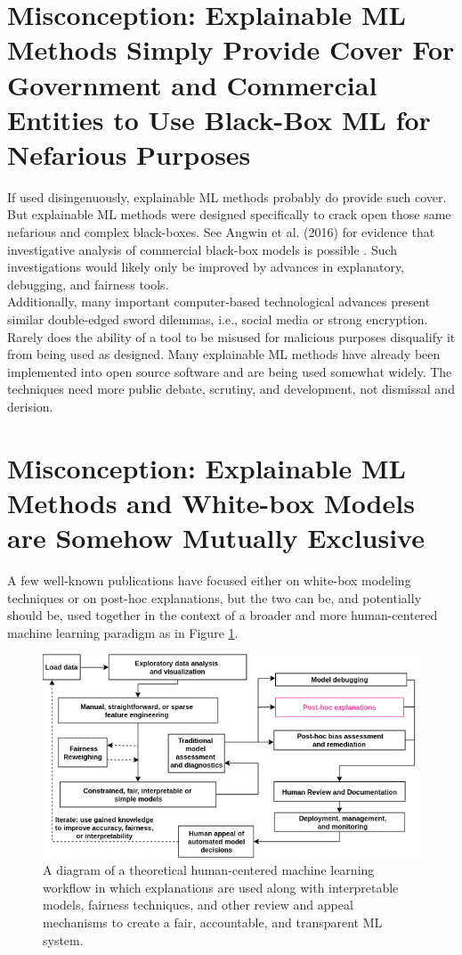 \documentclass{article}
\begin{document}
\section{Misconception: Explainable ML Methods Simply Provide Cover For Government and Commercial Entities to Use Black-Box ML for Nefarious Purposes}

If used disingenuously, explainable ML methods probably do provide such cover. But explainable ML methods were designed specifically to crack open those same nefarious and complex black-boxes. See Angwin et al. (2016) for evidence that investigative analysis of commercial black-box models is possible \cite{angwin16}. Such investigations would likely only be improved by advances in explanatory, debugging, and fairness tools. \\

Additionally, many important computer-based technological advances present similar double-edged sword dilemmas, i.e., social media or strong encryption. Rarely does the ability of a tool to be misused for malicious purposes disqualify it from being used as designed. Many explainable ML methods have already been implemented into open source software and are being used somewhat widely. The techniques need more public debate, scrutiny, and development, not dismissal and derision.

\section{Misconception: Explainable ML Methods and White-box Models are Somehow Mutually Exclusive}

A few well-known publications have focused either on white-box modeling techniques or on post-hoc explanations, but the two can be, and potentially should be, used together in the context of  a broader and more human-centered machine learning paradigm as in Figure \ref{fig:hc_ml}. 

\begin{figure}[htb]
	\begin{center}
		\includegraphics[scale=0.33]{img/figure_2.png}
		\caption{A diagram of a theoretical human-centered machine learning workflow in which explanations are used along with interpretable models, fairness techniques, and other review and appeal mechanisms to create a fair, accountable, and transparent ML system.}
		\label{fig:hc_ml}
	\end{center}
\end{figure}	
\end{document}
